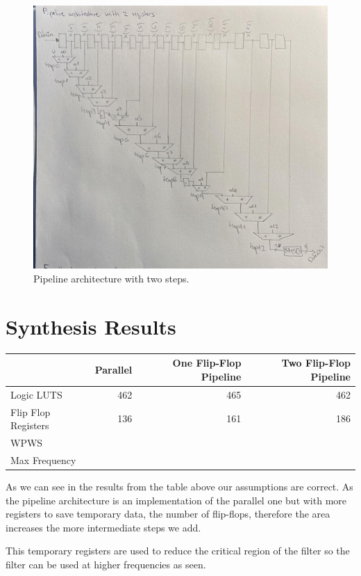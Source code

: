\documentclass[a4paper, 12pt]{article}
\begin{document}
\begin{figure}[htbp]
\centering
\includegraphics[width=.9\linewidth]{./img/architecture_pipeline.jpg}
\caption{Pipeline architecture with two steps.}
\end{figure}
\section{Synthesis Results}
\label{sec:orgdad9f73}

\begin{center}
\begin{tabular}{lrrr}
 & Parallel & One Flip-Flop Pipeline & Two Flip-Flop Pipeline\\
\hline
Logic LUTS & 462 & 465 & 462\\
Flip Flop Registers & 136 & 161 & 186\\
WPWS &  &  & \\
Max Frequency &  &  & \\
\end{tabular}
\end{center}

As we can see in the results from the table above our assumptions are correct. As the pipeline architecture is an implementation of the parallel one but with more registers to save temporary data, the number of flip-flops, therefore the area increases the more intermediate steps we add.

This temporary registers are used to reduce the critical region of the filter so the filter can be used at higher frequencies as seen.
\end{document}
